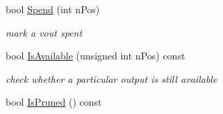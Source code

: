 \begin{DoxyCompactItemize}
\mbox{\label{class_c_coins_a99210076cac4b1ac521a532d3b5df182}} 
bool \mbox{\hyperlink{class_c_coins_a99210076cac4b1ac521a532d3b5df182}{Spend}} (int n\+Pos)
\begin{DoxyCompactList}\small\item\em mark a vout spent \end{DoxyCompactList}\item 
\mbox{\label{class_c_coins_aa645bc3d18f74e91430ac178a9d28ee4}} 
bool \mbox{\hyperlink{class_c_coins_aa645bc3d18f74e91430ac178a9d28ee4}{Is\+Available}} (unsigned int n\+Pos) const
\begin{DoxyCompactList}\small\item\em check whether a particular output is still available \end{DoxyCompactList}\item 
bool \mbox{\hyperlink{class_c_coins_a597a7cb8830fc29565918ce1823b2244}{Is\+Pruned}} () const
\end{DoxyCompactItemize}
